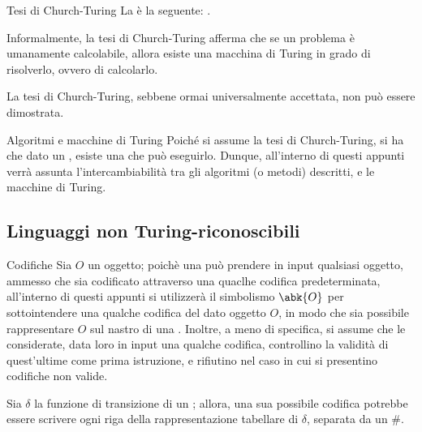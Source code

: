 \documentclass[a4paper, 12pt]{report}
\begin{document}
    \begin{frameddefn}{Tesi di Church-Turing}
        La  è la seguente: .

        Informalmente, la tesi di Church-Turing afferma che se un problema è umanamente calcolabile, allora esiste una macchina di Turing in grado di risolverlo, ovvero di calcolarlo.

        La tesi di Church-Turing, sebbene ormai universalmente accettata, non può essere dimostrata.
    \end{frameddefn}

    \begin{framedobs}[label={alg tm}]{Algoritmi e macchine di Turing}
        Poiché si assume la tesi di Church-Turing, si ha che dato un , esiste una  che può eseguirlo. Dunque, all'interno di questi appunti verrà assunta l'intercambiabilità tra gli algoritmi (o metodi) descritti, e le macchine di Turing.
    \end{framedobs}

    \subsection{Linguaggi non Turing-riconoscibili}
    
    \begin{framedobs}{Codifiche}
        Sia $O$ un oggetto; poichè una \TM può prendere in input qualsiasi oggetto, ammesso che sia codificato attraverso una quaclhe codifica predeterminata, all'interno di questi appunti si utilizzerà il simbolismo $\abk{O}$ per sottointendere una qualche codifica del dato oggetto $O$, in modo che sia possibile rappresentare $O$ sul nastro di una \TM. Inoltre, a meno di specifica, si assume che le \TM considerate, data loro in input una qualche codifica, controllino la validità di quest'ultime come prima istruzione, e rifiutino nel caso in cui si presentino codifiche non valide.
    \end{framedobs}

    \begin{example}
        Sia $\delta$ la funzione di transizione di un \DFA; allora, una sua possibile codifica potrebbe essere scrivere ogni riga della rappresentazione tabellare di $\delta$, separata da un \ttt \#.
    \end{example}
\end{document}

